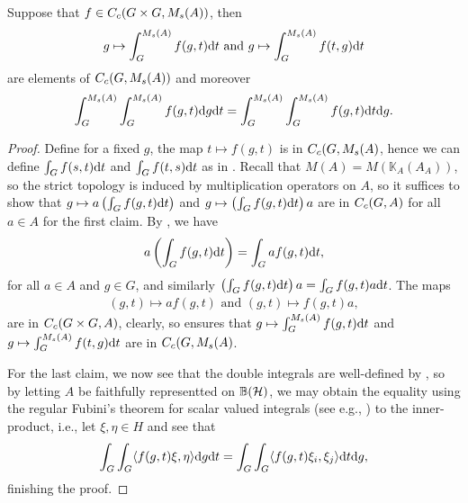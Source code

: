 \begin{theorem}
Suppose that $f \in C_c(G \times G, M_s(A))$, then 
\begin{align*}
	g \mapsto \int_G^{M_s(A)} f(g,t) \mathrm{d} t \text{ and } g \mapsto \int_G^{M_s(A)} f(t,g) \mathrm{d} t
\end{align*}
are elements of $C_c(G,M_s(A))$ and moreover
\begin{align*}
	\int_G^{M_s(A)} \int_G^{M_s(A)} f(g,t) \mathrm{d} g \mathrm{d} t = \int_G^{M_s(A)} \int_G^{M_s(A)} f(g,t) \mathrm{d} t \mathrm{d} g.
\end{align*}
\label{int:fubini}
\end{theorem}
\begin{proof}
Define for a fixed $g$, the map $t \mapsto f(g,t)$ is in $C_c(G,M_s(A)$, hence we can define $\int_G f(s,t) \mathrm{d} t$ and $\int_G f(t,s) \mathrm{d} t$ as in . Recall that $M(A) = M(\mathbb{K}_A(A_A))$, so the strict topology is induced by multiplication operators on $A$, so it suffices to show that $g \mapsto a \left(\int_Gf(g,t) \mathrm{d} t\right)$ and $g \mapsto \left(\int_G f(g,t) \mathrm{d} t\right) a $ are in $C_c(G,A)$ for all $ a \in A$ for the first claim. By , we have 
\begin{align*}
a \left( \int_G f(g,t) \mathrm{d} t \right) = \int_G a f(g,t) \mathrm{d} t,
\end{align*}
for all $a \in A$ and $g \in G$, and similarly $\left( \int_G f(g,t) \mathrm{d} t \right)a = \int_G f(g,t) a \mathrm{d} t$. The maps 
\begin{align*}
	(g,t) \mapsto a f(g,t) \text{ and } (g,t) \mapsto f(g,t) a,
\end{align*}
are in $C_c(G \times G , A)$, clearly, so  ensures that $g \mapsto \int_G^{M_s(A)} f(g,t) \mathrm{d} t$ and $g \mapsto \int_G ^{M_s(A)} f(t,g) \mathrm{d} t$ are in $C_c(G,M_s(A)$.

For the last claim, we now see that the double integrals are well-defined by , so by letting $A$ be faithfully representted on $\mathbb{B}(\mathcal{H})$, we may obtain the equality using the regular Fubini's theorem for scalar valued integrals (see e.g., \cite{schilling}) to the inner-product, i.e., let $\xi, \eta \in H$ and see that 
\begin{align*}
	\int_G \int_G \langle f(g,t) \xi, \eta \rangle \mathrm{d} g \mathrm{d} t = \int_G \int_G \langle f(g,t) \xi_i, \xi_j \rangle \mathrm{d} t \mathrm{d} g,
\end{align*}
finishing the proof.
\end{proof}

